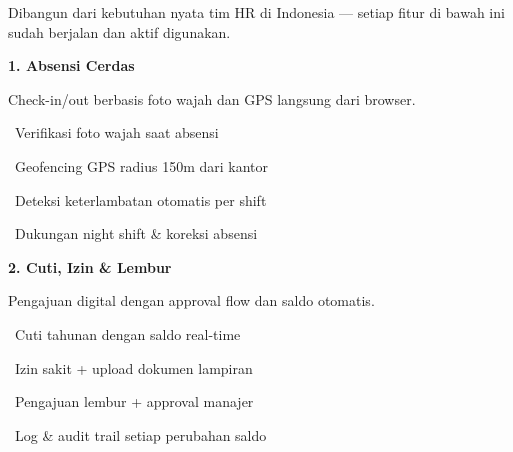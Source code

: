 \documentclass[a4paper]{article}
\begin{document}
{\fontsize{9.5}{13}\selectfont\color{TextLight}
Dibangun dari kebutuhan nyata tim HR di Indonesia — setiap fitur di bawah ini sudah berjalan dan aktif digunakan.}

\vspace{6pt}

\noindent
\begin{minipage}[t]{0.485\textwidth}
    \colorbox{BluePrimary}{%
        \begin{minipage}{\dimexpr\textwidth-14pt}
            \vspace{5pt}
            {\fontsize{10}{13}\selectfont\bfseries\color{White} 1. Absensi Cerdas}
            \vspace{5pt}
        \end{minipage}}
    \vspace{5pt}
    {\fontsize{9}{12}\selectfont\color{TextDark}%
    Check-in/out berbasis foto wajah dan GPS langsung dari browser.\par\vspace{3pt}
    \textbullet\ Verifikasi foto wajah saat absensi\par\vspace{2pt}%
    \textbullet\ Geofencing GPS radius 150m dari kantor\par\vspace{2pt}%
    \textbullet\ Deteksi keterlambatan otomatis per shift\par\vspace{2pt}%
    \textbullet\ Dukungan night shift \& koreksi absensi}%
\end{minipage}%
\hfill
\begin{minipage}[t]{0.485\textwidth}
    \colorbox{EmeraldPrimary}{%
        \begin{minipage}{\dimexpr\textwidth-14pt}
            \vspace{5pt}
            {\fontsize{10}{13}\selectfont\bfseries\color{White} 2. Cuti, Izin \& Lembur}
            \vspace{5pt}
        \end{minipage}}
    \vspace{5pt}
    {\fontsize{9}{12}\selectfont\color{TextDark}%
    Pengajuan digital dengan approval flow dan saldo otomatis.\par\vspace{3pt}
    \textbullet\ Cuti tahunan dengan saldo real-time\par\vspace{2pt}%
    \textbullet\ Izin sakit + upload dokumen lampiran\par\vspace{2pt}%
    \textbullet\ Pengajuan lembur + approval manajer\par\vspace{2pt}%
    \textbullet\ Log \& audit trail setiap perubahan saldo}%
\end{minipage}
\end{document}

